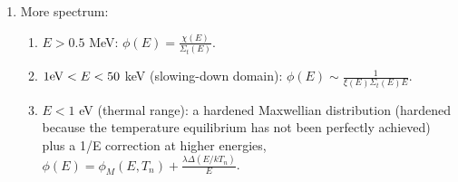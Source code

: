 \documentclass{school-22.211-notes}
\begin{document}
\begin{enumerate}
\begin{enumerate}
    \end{enumerate}
\item More spectrum: 
  \begin{enumerate}
  \item $E > 0.5$ MeV: $\phi(E) = \frac{\chi(E)}{\Sigma_t(E)}$.
  \item $1 \mathrm{eV} < E < 50$ keV (slowing-down domain): $\phi(E) \sim \frac{1}{\xi(E) \Sigma_t(E) E}$. 
  \item $E < 1$ eV (thermal range): a hardened Maxwellian distribution (hardened because the temperature equilibrium has not been perfectly achieved) plus a 1/E correction at higher energies, $\phi(E) = \phi_M (E, T_n) + \frac{ \lambda \Delta (E/kT_n) }{E}$. 
  \end{enumerate}
\end{enumerate}
\end{document}
